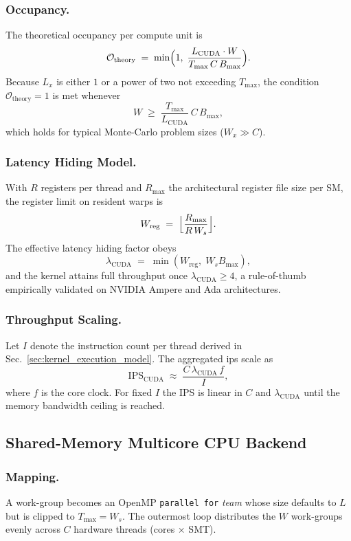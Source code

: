 \subsubsection{Occupancy.}  The theoretical occupancy per compute unit is
\[
  \mathcal{O}_\text{theory} \;=\; \min\Bigl(1,\;\frac{L_\text{CUDA}
                                         \cdot W}{T_{\max}\,C\,B_{\max}}\Bigr).
\]
Because $L_x$ is either $1$ or a power of two not exceeding
$T_{\max}$, the condition $\mathcal{O}_\text{theory}=1$ is met whenever
\[
  W \;\ge\; \frac{T_{\max}}{L_\text{CUDA}}\,C\,B_{\max},
\]
which holds for typical Monte-Carlo problem sizes ($W_x\gg C$).

\subsubsection{Latency Hiding Model.}  With $R$ registers per thread and
$R_{\max}$ the architectural register file size per SM, the register limit on
resident warps is
\[
  W_{\mathrm{reg}} \;=\; \Bigl\lfloor \frac{R_{\max}}{R\,W_s}\Bigr\rfloor.
\]
The effective latency hiding factor obeys
\[
  \lambda_\text{CUDA} \;=\; \min(W_{\mathrm{reg}},\; W_s B_{\max}),
\]
and the kernel attains full throughput once $\lambda_\text{CUDA}\ge 4$, a
rule-of-thumb empirically validated on NVIDIA Ampere and Ada architectures.

\subsubsection{Throughput Scaling.}  Let $I$ denote the instruction count per
thread derived in Sec.~\ref{sec:kernel_execution_model}.  The aggregated \acrfull{ips} scale as
\[
  \text{IPS}_{\text{CUDA}} \;\approx\; \frac{C\,\lambda_\text{CUDA}\,f}{I},
\]
where $f$ is the core clock.  For fixed $I$ the IPS is linear in $C$ and
$\lambda_\text{CUDA}$ until the memory bandwidth ceiling is reached.

\subsection{Shared-Memory Multicore CPU Backend}
\label{subsec:cpu_backend}

\subsubsection{Mapping.}  A work-group becomes an OpenMP \verb|parallel for|
\emph{team} whose size defaults to $L$ but is clipped to $T_{\max}=W_s$.  The
outermost loop distributes the $W$ work-groups evenly across $C$ hardware
threads (cores × SMT).

